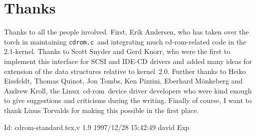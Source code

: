 \documentclass{article}
\def\version{$Id: cdrom-standard.tex,v 1.9 1997/12/28 15:42:49 david Exp $}
\newcommand{\newsection}[1]{\newpage\section{#1}}
\def\linux{{\sc Linux}}
\def\cdrom{{\sc cd-rom}}
\def\cdromc{{\tt {cdrom.c}}}
\begin{document}
\newsection{Thanks}

Thanks to all the people involved.  First, Erik Andersen, who has
taken over the torch in maintaining \cdromc\ and integrating much
\cdrom-related code in the 2.1-kernel.  Thanks to Scott Snyder and
Gerd Knorr, who were the first to implement this interface for SCSI
and IDE-CD drivers and added many ideas for extension of the data
structures relative to kernel~2.0.  Further thanks to Heiko Eissfeldt,
Thomas Quinot, Jon Tombs, Ken Pizzini, Eberhard M\"onkeberg and Andrew
Kroll, the \linux\ \cdrom\ device driver developers who were kind
enough to give suggestions and criticisms during the writing. Finally
of course, I want to thank Linus Torvalds for making this possible in
the first place.

\vfill
$ \version\ $
\eject
\end{document}
